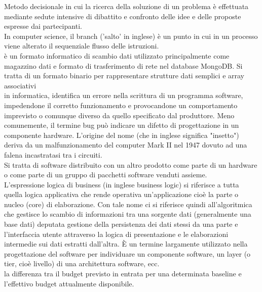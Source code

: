 \documentclass{scalatekids-article}
\begin{document}
 Metodo decisionale in cui la ricerca della soluzione di un problema è effettuata mediante sedute intensive di dibattito e confronto delle idee e delle proposte espresse dai partecipanti.
\\

 In computer science, il branch ('salto' in inglese) è un punto in cui in un processo viene alterato il sequenziale flusso delle istruzioni.
\\

 è un formato informatico di scambio dati utilizzato principalmente come magazzino dati e formato di trasferimento di rete nel database MongoDB. Si tratta di un formato binario per rappresentare strutture dati semplici e array associativi
\\

 in informatica, identifica un errore nella scrittura di un programma software, impedendone il corretto funzionamento e provocandone un comportamento imprevisto o comunque diverso da quello specificato dal produttore. Meno comunemente, il termine bug può indicare un difetto di progettazione in un componente hardware.
L'origine del nome (che in inglese significa "insetto") deriva da un malfunzionamento del computer Mark II nel 1947 dovuto ad una falena incastratasi tra i circuiti.
\\

 Si tratta di software distribuito con un altro prodotto come parte di un hardware o come parte di un gruppo di pacchetti software venduti assieme.
\\

 L'espressione logica di business (in inglese business logic) si riferisce a tutta quella logica applicativa che rende operativa un'applicazione cioè la parte o nucleo (core) di elaborazione.
Con tale nome ci si riferisce quindi all'algoritmica che gestisce lo scambio di informazioni tra una sorgente dati (generalmente una base dati) deputata gestione della persistenza dei dati stessi da una parte e l'interfaccia utente attraverso la logica di presentazione e le elaborazioni intermedie sui dati estratti dall'altra.
È un termine largamente utilizzato nella progettazione del software per individuare un componente software, un layer (o tier, cioè livello) di una architettura software, ecc.
\\

 la differenza tra il budget previsto in entrata per una determinata baseline e l'effettivo budget attualmente disponibile.
\\
\end{document}
